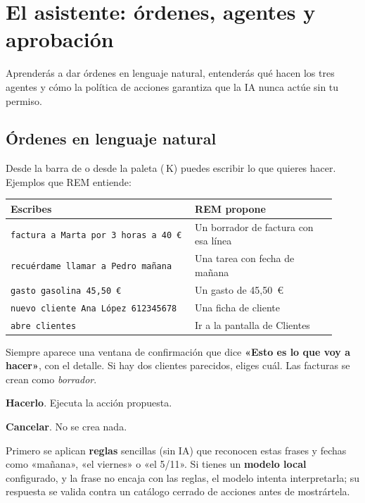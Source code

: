 \chapter{El asistente: órdenes, agentes y aprobación}\label{cap:asistente}

\begin{objbox}
Aprenderás a dar órdenes en lenguaje natural, entenderás qué hacen los tres agentes y cómo la política de acciones garantiza que la IA nunca actúe sin tu permiso.
\end{objbox}

\section{Órdenes en lenguaje natural}
Desde la barra de  o desde la paleta (\cmd\,K) puedes escribir lo que quieres hacer. Ejemplos que REM entiende:
\begin{center}
\begin{tabular}{@{}p{0.52\linewidth}p{0.4\linewidth}@{}}
\toprule
\textbf{Escribes} & \textbf{REM propone} \\
\midrule
\texttt{factura a Marta por 3 horas a 40 €} & Un borrador de factura con esa línea \\
\texttt{recuérdame llamar a Pedro mañana} & Una tarea con fecha de mañana \\
\texttt{gasto gasolina 45,50 €} & Un gasto de 45,50~€ \\
\texttt{nuevo cliente Ana López 612345678} & Una ficha de cliente \\
\texttt{abre clientes} & Ir a la pantalla de Clientes \\
\bottomrule
\end{tabular}
\end{center}
Siempre aparece una ventana de confirmación que dice \textbf{«Esto es lo que voy a hacer»}, con el detalle. Si hay dos clientes parecidos, eliges cuál. Las facturas se crean como \emph{borrador}.

\begin{leyenda}
\item[\mk{1}] \textbf{Hacerlo}. Ejecuta la acción propuesta.
\item[\mk{2}] \textbf{Cancelar}. No se crea nada.
\end{leyenda}

Primero se aplican \textbf{reglas} sencillas (sin IA) que reconocen estas frases y fechas como «mañana», «el viernes» o «el 5/11». Si tienes un \textbf{modelo local} configurado, y la frase no encaja con las reglas, el modelo intenta interpretarla; su respuesta se valida contra un catálogo cerrado de acciones antes de mostrártela.

